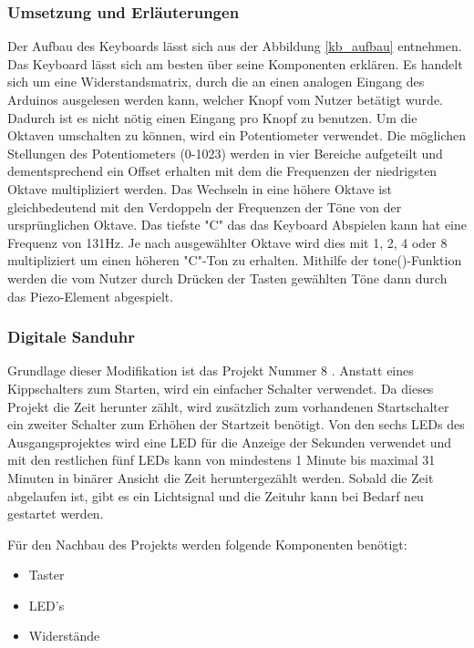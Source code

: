 \subsubsection{Umsetzung und Erläuterungen}
Der Aufbau des Keyboards lässt sich aus der Abbildung \ref{kb_aufbau} entnehmen.
Das Keyboard lässt sich am besten über seine Komponenten erklären.
Es handelt sich um eine Widerstandsmatrix, durch die an einen analogen Eingang des Arduinos ausgelesen werden kann,
welcher Knopf vom Nutzer betätigt wurde. Dadurch ist es nicht nötig einen Eingang pro Knopf zu benutzen.
Um die Oktaven umschalten zu können, wird ein Potentiometer verwendet.
Die möglichen Stellungen des Potentiometers (0-1023) werden in vier Bereiche aufgeteilt und 
dementsprechend ein Offset erhalten mit dem die Frequenzen der niedrigsten Oktave multipliziert werden.
Das Wechseln in eine höhere Oktave ist gleichbedeutend mit den Verdoppeln der Frequenzen der Töne von der ursprünglichen Oktave.
Das tiefste "C" das das Keyboard Abspielen kann hat eine Frequenz von 131Hz. Je nach ausgewählter Oktave wird dies mit 1, 2, 4 oder 8 multipliziert um einen höheren "C"-Ton zu erhalten.
Mithilfe der tone()-Funktion werden die vom Nutzer durch Drücken der Tasten gewählten Töne dann durch das Piezo-Element abgespielt.


\subsubsection{Digitale Sanduhr}
Grundlage dieser Modifikation ist das Projekt Nummer 8 \autocite{arduino}. Anstatt eines Kippschalters zum Starten, wird ein einfacher Schalter verwendet. Da dieses Projekt die Zeit herunter zählt, wird zusätzlich zum vorhandenen Startschalter ein zweiter Schalter zum Erhöhen der Startzeit benötigt. Von den sechs LEDs des Ausgangsprojektes wird eine LED für die Anzeige der Sekunden verwendet und mit den restlichen fünf LEDs kann von mindestens 1 Minute bis maximal 31 Minuten in binärer Ansicht die Zeit heruntergezählt werden. Sobald die Zeit abgelaufen ist, gibt es ein Lichtsignal und die Zeituhr kann bei Bedarf neu gestartet werden.

Für den Nachbau des Projekts werden folgende Komponenten benötigt:
\begin{itemize}
\item{Taster}
\item{LED's}
\item{Widerstände}
\end{itemize}

